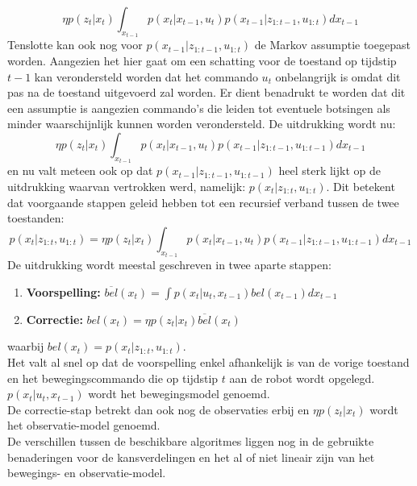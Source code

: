 \documentclass{book}
\begin{document}
\begin{equation*}
\eta p(z_t|x_t)\int_{x_{t-1}}p(x_t|x_{t-1},u_{t})p(x_{t-1}|z_{1:t-1},u_{1:t})dx_{t-1}
\end{equation*}
Tenslotte kan ook nog voor $p(x_{t-1}|z_{1:t-1},u_{1:t})$ de Markov assumptie toegepast worden. Aangezien het hier gaat om een schatting voor de toestand op tijdstip $t-1$ kan verondersteld worden dat het commando $u_t$ onbelangrijk is omdat dit pas na de toestand uitgevoerd zal worden. Er dient benadrukt te worden dat dit een assumptie is aangezien commando's die leiden tot eventuele botsingen als minder waarschijnlijk kunnen worden verondersteld. De uitdrukking wordt nu:
\begin{equation*}
\eta p(z_t|x_t)\int_{x_{t-1}}p(x_t|x_{t-1},u_{t})p(x_{t-1}|z_{1:t-1},u_{1:t-1})dx_{t-1}
\end{equation*}
en nu valt meteen ook op dat $p(x_{t-1}|z_{1:t-1},u_{1:t-1})$ heel sterk lijkt op de uitdrukking waarvan vertrokken werd, namelijk: $p(x_t|z_{1:t},u_{1:t})$. Dit betekent dat voorgaande stappen geleid hebben tot een recursief verband tussen de twee toestanden:
\begin{equation*}
p(x_t|z_{1:t},u_{1:t})=\eta p(z_t|x_t)\int_{x_{t-1}}p(x_t|x_{t-1},u_{t})p(x_{t-1}|z_{1:t-1},u_{1:t-1})dx_{t-1}
\end{equation*}
De uitdrukking wordt meestal geschreven in twee aparte stappen:
\begin{enumerate}
	\item \textbf{Voorspelling: }$\overline{bel}(x_t) = \int p(x_t|u_t,x_{t-1})bel(x_{t-1})dx_{t-1}$
	\item \textbf{Correctie: } $bel(x_t) = \eta p(z_t|x_t)\overline{bel}(x_t)$
\end{enumerate}
waarbij $bel(x_t) = p(x_t|z_{1:t},u_{1:t})$.\\
Het valt al snel op dat de voorspelling enkel afhankelijk is van de vorige toestand en het bewegingscommando die op tijdstip $t$ aan de robot wordt opgelegd. $p(x_t|u_t,x_{t-1})$ wordt het bewegingsmodel genoemd.\\
De correctie-stap betrekt dan ook nog de observaties erbij en $\eta p(z_t|x_t)$ wordt het observatie-model genoemd.\\
De verschillen tussen de beschikbare algoritmes liggen nog in de gebruikte benaderingen voor de kansverdelingen en het al of niet lineair zijn van het bewegings- en observatie-model.
\end{document}
